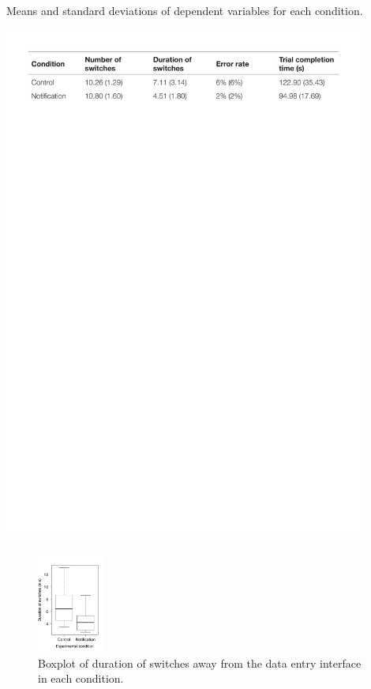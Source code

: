 \begin{table}
\caption{Means and standard deviations of dependent variables for each condition.}
\centering
\includegraphics[width=0.9\textwidth]{images/ch56/ch56-Table1.pdf}
\vspace{-3pt}
\label{tbl:ch56-Table1}
\end{table}

\begin{figure}
\centering
\includegraphics[width=0.2\textwidth]{images/ch56/ch56-Figure2.pdf}
\caption{Boxplot of duration of switches away from the data entry interface in each condition.}
\label{fig:ch56-Figure2}
\end{figure}

